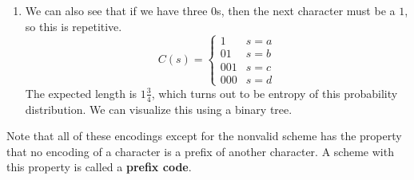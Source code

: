 \documentclass{article}
\begin{document}
\begin{example}
\begin{enumerate}
        \item We can also see that if we have three $0$s, then the next character must be a $1$, so this is repetitive. 
        \begin{equation}
          C (s) = \begin{cases} 1 & s = a \\ 01 & s = b \\ 001 & s = c \\ 000 & s = d \end{cases}
        \end{equation}
        The expected length is $1 \frac{3}{4}$, which turns out to be entropy of this probability distribution. We can visualize this using a binary tree. 
      \end{enumerate}
    \end{example}

    \begin{definition}
      Note that all of these encodings except for the nonvalid scheme has the property that no encoding of a character is a prefix of another character. A scheme with this property is called a \textbf{prefix code}. 
    \end{definition}
\end{document}
